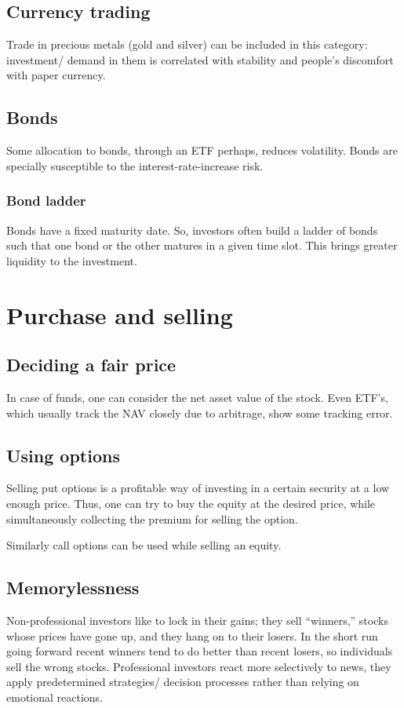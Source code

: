 \documentclass[oneside, article]{memoir}
\begin{document}
\subsection{Currency trading}
Trade in precious metals (gold and silver) can be included in this category: investment/ demand in them is correlated with stability and people's discomfort with paper currency.

\subsection{Bonds}
Some allocation to bonds, through an ETF perhaps, reduces volatility. Bonds are specially susceptible to the interest-rate-increase risk.

\subsubsection{Bond ladder}
Bonds have a fixed maturity date. So, investors often build a ladder of bonds such that one bond or the other matures in a given time slot. This brings greater liquidity to the investment.

\section{Purchase and selling}
\subsection{Deciding a fair price}
In case of funds, one can consider the net asset value of the stock. Even ETF's, which usually track the NAV closely due to arbitrage, show some tracking error.

\subsection{Using options}
Selling put options is a profitable way of investing in a certain security at a low enough price. Thus, one can try to buy the equity at the desired price, while simultaneously collecting the premium for selling the option.

Similarly call options can be used while selling an equity.

\subsection{Memorylessness}
Non-professional investors like to lock in their gains; they sell “winners,” stocks whose prices have gone up, and they hang on to their losers. In the short run going forward recent winners tend to do better than recent losers, so individuals sell the wrong stocks. Professional investors react more selectively to news, they apply predetermined strategies/ decision processes rather than relying on emotional reactions.
\end{document}
